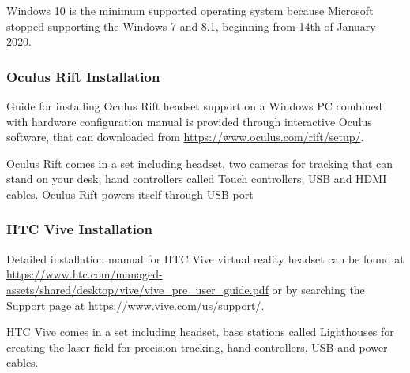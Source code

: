 Windows 10 is the minimum supported operating system because Microsoft stopped supporting the Windows 7 and 8.1, beginning from 14th of January 2020.

\subsubsection*{Oculus Rift Installation}\label{rift-installation}

Guide for installing Oculus Rift headset support on a Windows PC combined with hardware configuration manual is provided through interactive Oculus software, that can downloaded from \url{https://www.oculus.com/rift/setup/}.

Oculus Rift comes in a set including headset, two cameras for tracking that can stand on your desk, hand controllers called Touch controllers, USB and HDMI cables. Oculus Rift powers itself through USB port

\subsubsection*{HTC Vive Installation}\label{vive-installation}

Detailed installation manual for HTC Vive virtual reality headset can be found at \url{https://www.htc.com/managed-assets/shared/desktop/vive/vive_pre_user_guide.pdf} or by searching the Support page at \url{ https://www.vive.com/us/support/}.

HTC Vive comes in a set including headset, base stations called Lighthouses for creating the laser field for precision tracking, hand controllers, USB and power cables.
